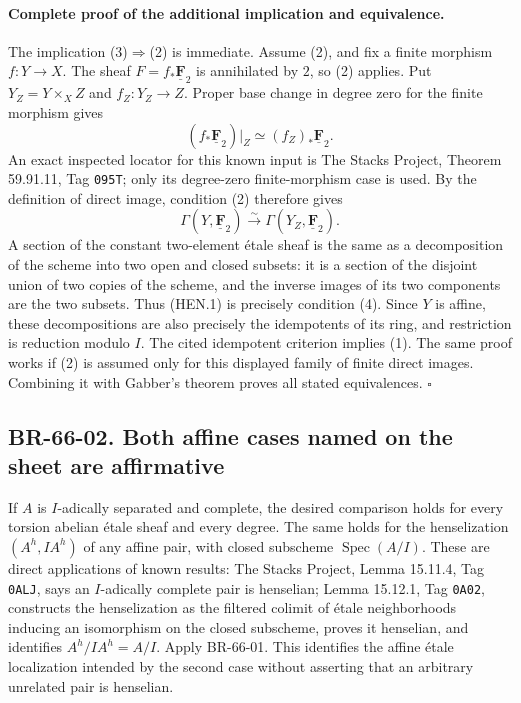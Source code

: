 \paragraph{Complete proof of the additional implication and equivalence.}
The implication (3)$\Rightarrow$(2) is immediate. Assume (2), and
fix a finite morphism $f:Y\to X$. The sheaf
$F=f_*\underline{\mathbf F}_2$ is annihilated by $2$, so (2) applies.
Put $Y_Z=Y\times_X Z$ and $f_Z:Y_Z\to Z$. Proper base change in
degree zero for the finite morphism gives
\[
 (f_*\underline{\mathbf F}_2)|_Z
       \simeq (f_Z)_*\underline{\mathbf F}_2.
\]
An exact inspected locator for this known input is The Stacks
Project, Theorem 59.91.11, Tag \texttt{095T}; only its degree-zero
finite-morphism case is used. By the definition of direct image,
condition (2) therefore gives
\[
 \Gamma(Y,\underline{\mathbf F}_2)
       \xrightarrow{\sim}\Gamma(Y_Z,\underline{\mathbf F}_2).
 \tag{HEN.1}
\]
A section of the constant two-element \'etale sheaf is the same as
a decomposition of the scheme into two open and closed subsets:
it is a section of the disjoint union of two copies of the scheme,
and the inverse images of its two components are the two subsets.
Thus (HEN.1) is precisely condition (4). Since $Y$ is affine,
these decompositions are also precisely the idempotents of its ring,
and restriction is reduction modulo $I$. The cited idempotent
criterion implies (1). The same proof works if (2) is assumed only
for this displayed family of finite direct images. Combining it with
Gabber's theorem proves all stated equivalences. \(\square\)

\subsection{BR-66-02. Both affine cases named on the sheet are affirmative}
If $A$ is $I$-adically separated and complete, the desired comparison
holds for every torsion abelian \'etale sheaf and every degree.
The same holds for the henselization $(A^h,IA^h)$ of any affine pair,
with closed subscheme $\operatorname{Spec}(A/I)$.
These are direct applications of known results: The Stacks Project,
Lemma 15.11.4, Tag \texttt{0ALJ}, says an $I$-adically complete pair is
henselian; Lemma 15.12.1, Tag \texttt{0A02}, constructs the henselization
as the filtered colimit of \'etale neighborhoods inducing an isomorphism
on the closed subscheme, proves it henselian, and identifies
$A^h/IA^h=A/I$. Apply BR-66-01. This identifies the affine \'etale
localization intended by the second case without asserting that an
arbitrary unrelated pair is henselian.

